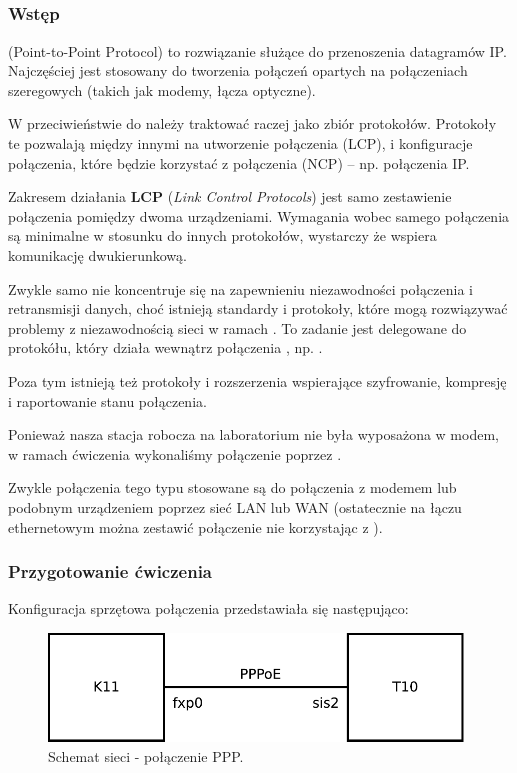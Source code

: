 \subsection{\ppp}
\subsubsection{Wstęp}
\ppp (Point-to-Point Protocol) to rozwiązanie służące do przenoszenia datagramów IP.
Najczęściej jest stosowany do tworzenia połączeń opartych na połączeniach szeregowych (takich jak modemy, łącza optyczne)\cite{ppp:stevens-ppp}.

W przeciwieństwie do \arp{} \ppp{} należy traktować raczej jako zbiór protokołów.
Protokoły te pozwalają między innymi na utworzenie połączenia \ppp (LCP), i konfiguracje połączenia, które będzie korzystać z połączenia \ppp (NCP) -- np. połączenia IP.

Zakresem działania \textbf{LCP} (\emph{Link Control Protocols}) jest samo zestawienie połączenia pomiędzy dwoma urządzeniami.
Wymagania wobec samego połączenia są minimalne w stosunku do innych protokołów, wystarczy że wspiera komunikację dwukierunkową.

Zwykle samo \ppp nie koncentruje się na zapewnieniu niezawodności połączenia i retransmisji danych, choć istnieją standardy i protokoły, które mogą rozwiązywać problemy z niezawodnością sieci w ramach \ppp{}.
To zadanie jest delegowane do protokółu, który działa wewnątrz połączenia \ppp{}, np. \ip{}.

Poza tym istnieją też protokoły i rozszerzenia \ppp{} wspierające szyfrowanie, kompresję i raportowanie stanu połączenia.

Ponieważ nasza stacja robocza na laboratorium nie była wyposażona w modem, w ramach ćwiczenia \ppp{} wykonaliśmy połączenie \tcp{} poprzez \pppoe{}.

Zwykle połączenia tego typu stosowane są do połączenia z modemem lub podobnym urządzeniem poprzez sieć LAN lub WAN \cite{ppp:stevens-pppoe} (ostatecznie na łączu ethernetowym można zestawić połączenie \tcp{} nie korzystając z \ppp{}).

\subsubsection{Przygotowanie ćwiczenia}

Konfiguracja sprzętowa połączenia przedstawiała się następująco:

\begin{figure}[h!]
  \centering
  \includegraphics[width=11cm]{figury/ppp/schemat-przed.pdf}
  \caption{Schemat sieci - połączenie PPP.}
  \label{fig:ppp:schemat-sieci-przed}
\end{figure}

